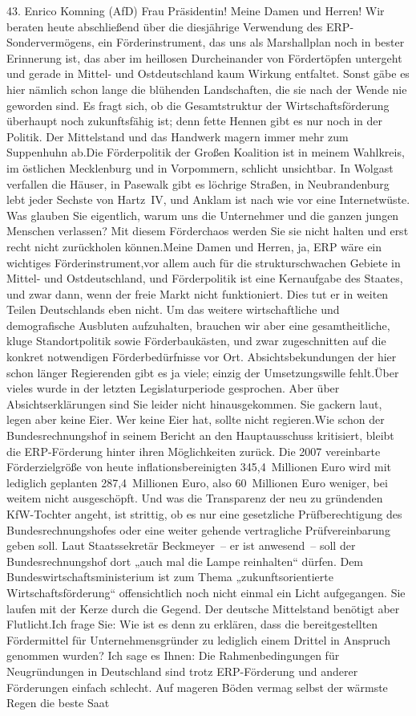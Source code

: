 \documentclass{article}
\begin{document}
	43. Enrico Komning (AfD) Frau Präsidentin! Meine Damen und Herren! Wir beraten heute abschließend über die diesjährige Verwendung des ERP-Sondervermögens, ein Förderinstrument, das uns als Marshallplan noch in bester Erinnerung ist, das aber im heillosen Durcheinander von Fördertöpfen untergeht und gerade in Mittel- und Ostdeutschland kaum Wirkung entfaltet. Sonst gäbe es hier nämlich schon lange die blühenden Landschaften, die sie nach der Wende nie geworden sind. Es fragt sich, ob die Gesamtstruktur der Wirtschaftsförderung überhaupt noch zukunftsfähig ist; denn fette Hennen gibt es nur noch in der Politik. Der Mittelstand und das Handwerk magern immer mehr zum Suppenhuhn ab.Die Förderpolitik der Großen Koalition ist in meinem Wahlkreis, im östlichen Mecklenburg und in Vorpommern, schlicht unsichtbar. In Wolgast verfallen die Häuser, in Pasewalk gibt es löchrige Straßen, in Neubrandenburg lebt jeder Sechste von Hartz IV, und Anklam ist nach wie vor eine Internetwüste. Was glauben Sie eigentlich, warum uns die Unternehmer und die ganzen jungen Menschen verlassen? Mit diesem Förderchaos werden Sie sie nicht halten und erst recht nicht zurückholen können.Meine Damen und Herren, ja, ERP wäre ein wichtiges Förderinstrument,vor allem auch für die strukturschwachen Gebiete in Mittel- und Ostdeutschland, und Förderpolitik ist eine Kernaufgabe des Staates, und zwar dann, wenn der freie Markt nicht funktioniert. Dies tut er in weiten Teilen Deutschlands eben nicht. Um das weitere wirtschaftliche und demografische Ausbluten aufzuhalten, brauchen wir aber eine gesamtheitliche, kluge Standortpolitik sowie Förderbaukästen, und zwar zugeschnitten auf die konkret notwendigen Förderbedürfnisse vor Ort. Absichtsbekundungen der hier schon länger Regierenden gibt es ja viele; einzig der Umsetzungswille fehlt.Über vieles wurde in der letzten Legislaturperiode gesprochen. Aber über Absichtserklärungen sind Sie leider nicht hinausgekommen. Sie gackern laut, legen aber keine Eier. Wer keine Eier hat, sollte nicht regieren.Wie schon der Bundesrechnungshof in seinem Bericht an den Hauptausschuss kritisiert, bleibt die ERP-Förderung hinter ihren Möglichkeiten zurück. Die 2007 vereinbarte Förderzielgröße von heute inflationsbereinigten 345,4 Millionen Euro wird mit lediglich geplanten 287,4 Millionen Euro, also 60 Millionen Euro weniger, bei weitem nicht ausgeschöpft. Und was die Transparenz der neu zu gründenden KfW-Tochter angeht, ist strittig, ob es nur eine gesetzliche Prüfberechtigung des Bundesrechnungshofes oder eine weiter gehende vertragliche Prüfvereinbarung geben soll. Laut Staatssekretär Beckmeyer – er ist anwesend – soll der Bundesrechnungshof dort „auch mal die Lampe reinhalten“ dürfen. Dem Bundeswirtschaftsministerium ist zum Thema „zukunftsorientierte Wirtschaftsförderung“ offensichtlich noch nicht einmal ein Licht aufgegangen. Sie laufen mit der Kerze durch die Gegend. Der deutsche Mittelstand benötigt aber Flutlicht.Ich frage Sie: Wie ist es denn zu erklären, dass die bereitgestellten Fördermittel für Unternehmensgründer zu lediglich einem Drittel in Anspruch genommen wurden? Ich sage es Ihnen: Die Rahmenbedingungen für Neugründungen in Deutschland sind trotz ERP-Förderung und anderer Förderungen einfach schlecht. Auf mageren Böden vermag selbst der wärmste Regen die beste Saat 
\end{document}
